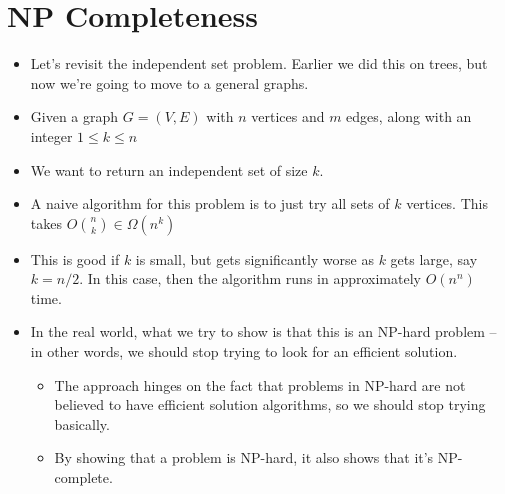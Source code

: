 \section{NP Completeness}
\begin{itemize}
	\item Let's revisit the independent set problem. Earlier we did this on trees, but now we're going to 
		move to a general graphs.
	\item Given a graph \( G = (V, E) \) with \( n \) vertices and \( m \) edges, along with an integer 
		\( 1 \le  k \le n \)
	\item We want to return an independent set of size \( k \). 
	\item A naive algorithm for this problem is to just try all sets of \( k \) vertices. This takes 
	\( O{n \choose k} \in \Omega(n^k) \) 
	\item This is good if \( k \) is small, but gets significantly worse as \( k \) gets large, say 
		\( k = n / 2 \). In this case, then the algorithm runs in approximately \( O(n^n) \) time.  
	\item In the real world, what we try to show is that this is an NP-hard problem -- in other words, we should 
		stop trying to look for an efficient solution.
		\begin{itemize}
			\item The approach hinges on the fact that problems in NP-hard are not believed to have efficient 
				solution algorithms, so we should stop trying basically.
			\item By showing that a problem is NP-hard, it also shows that it's NP-complete.


\end{itemize}
\end{itemize}
